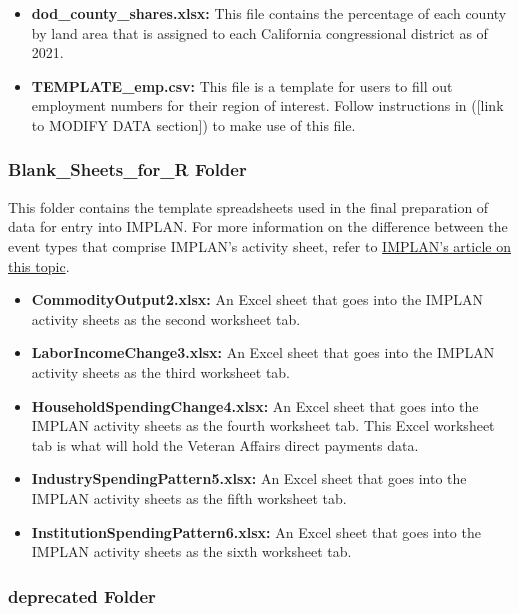 \documentclass[
]{book}
\providecommand{\tightlist}{%
  \setlength{\itemsep}{0pt}\setlength{\parskip}{0pt}}
\begin{document}
\begin{itemize}
\item
  \textbf{dod\_county\_shares.xlsx:} This file contains the percentage of each county by land area that is assigned to each California congressional district as of 2021.
\item
  \textbf{TEMPLATE\_emp.csv:} This file is a template for users to fill out employment numbers for their region of interest. Follow instructions in ({[}link to MODIFY DATA section{]}) to make use of this file.
\end{itemize}

\hypertarget{blank_sheets_for_r-folder}{%
\subsubsection{Blank\_Sheets\_for\_R Folder}\label{blank_sheets_for_r-folder}}

This folder contains the template spreadsheets used in the final preparation of data for entry into IMPLAN. For more information on the difference between the event types that comprise IMPLAN's activity sheet, refer to \href{https://support.implan.com/hc/en-us/articles/360019638713-Explaining-Event-Types}{IMPLAN's article on this topic}.

\begin{itemize}
\tightlist
\item
  \textbf{CommodityOutput2.xlsx:} An Excel sheet that goes into the IMPLAN activity sheets as the second worksheet tab.
\item
  \textbf{LaborIncomeChange3.xlsx:} An Excel sheet that goes into the IMPLAN activity sheets as the third worksheet tab.
\item
  \textbf{HouseholdSpendingChange4.xlsx:} An Excel sheet that goes into the IMPLAN activity sheets as the fourth worksheet tab. This Excel worksheet tab is what will hold the Veteran Affairs direct payments data.
\item
  \textbf{IndustrySpendingPattern5.xlsx:} An Excel sheet that goes into the IMPLAN activity sheets as the fifth worksheet tab.
\item
  \textbf{InstitutionSpendingPattern6.xlsx:} An Excel sheet that goes into the IMPLAN activity sheets as the sixth worksheet tab.
\end{itemize}

\hypertarget{deprecated-folder}{%
\subsubsection{deprecated Folder}\label{deprecated-folder}}
\end{document}
